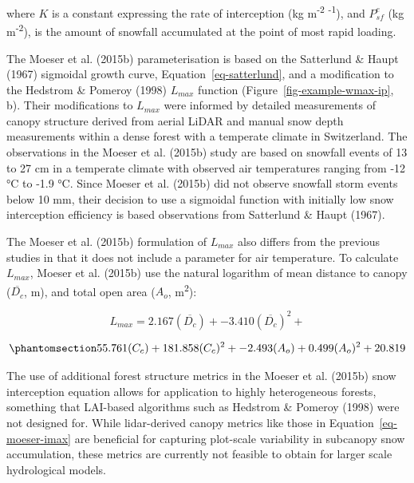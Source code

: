 \documentclass[
  letterpaper,
]{tex/uofsthesis-cs}
\begin{document}
where \(K\) is a constant expressing the rate of interception (kg
m\textsuperscript{-2} \textsuperscript{-1}), and \(P_{sf}^e\) (kg
m\textsuperscript{-2}), is the amount of snowfall accumulated at the
point of most rapid loading.

The Moeser et al. (2015b) parameterisation is based on the Satterlund \&
Haupt (1967) sigmoidal growth curve, Equation~\ref{eq-satterlund}, and a
modification to the Hedstrom \& Pomeroy (1998) \(L_{max}\) function
(Figure~\ref{fig-example-wmax-ip}, b). Their modifications to
\(L_{max}\) were informed by detailed measurements of canopy structure
derived from aerial LiDAR and manual snow depth measurements within a
dense forest with a temperate climate in Switzerland. The observations
in the Moeser et al. (2015b) study are based on snowfall events of 13 to
27 cm in a temperate climate with observed air temperatures ranging from
-12 °C to -1.9 °C. Since Moeser et al. (2015b) did not observe snowfall
storm events below 10 mm, their decision to use a sigmoidal function
with initially low snow interception efficiency is based observations
from Satterlund \& Haupt (1967).

The Moeser et al. (2015b) formulation of \(L_{max}\) also differs from
the previous studies in that it does not include a parameter for air
temperature. To calculate \(L_{max}\), Moeser et al. (2015b) use the
natural logarithm of mean distance to canopy (\(\overline{D_c}\), m),
and total open area (\(A_o\), m\textsuperscript{2}):

\[
L_{max} = 2.167(\overline{D_c}) + -3.410(\overline{D_c})^2 + 
\]

\begin{equation}\phantomsection\label{eq-moeser-imax}{
55.761(C_c) + 181.858(C_c)^2 + -2.493(A_o) + 0.499(A_o)^2 + 20.819
}\end{equation}

The use of additional forest structure metrics in the Moeser et al.
(2015b) snow interception equation allows for application to highly
heterogeneous forests, something that LAI-based algorithms such as
Hedstrom \& Pomeroy (1998) were not designed for. While lidar-derived
canopy metrics like those in Equation~\ref{eq-moeser-imax} are
beneficial for capturing plot-scale variability in subcanopy snow
accumulation, these metrics are currently not feasible to obtain for
larger scale hydrological models.
\end{document}
